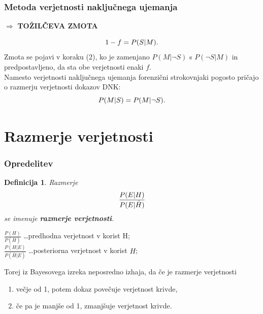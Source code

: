 \documentclass{beamer}
\newtheorem{definicija}{Definicija}
\begin{document}
\begin{frame}
    \frametitle{Metoda verjetnosti naključnega ujemanja}
    \begin{block}{}
        \centering
        $\Rightarrow$ \textbf{TOŽILČEVA ZMOTA}
    \end{block} \vspace{2mm}
    \[
        1 - f = P(S \lvert M). \vspace{2mm}
    \]
     Zmota se pojavi v koraku (2), ko je zamenjano $P(M \lvert \neg S)$ s $P(\neg S \lvert M)$ in predpostavljeno, da sta obe verjetnosti enaki $f$. \\\vspace{2mm}
     Namesto verjetnosti naključnega ujemanja forenzični strokovnjaki pogosto pričajo o razmerju verjetnosti dokazov DNK:
     \[
        P(M \lvert S) = P(M \lvert \neg S). \vspace{2mm}
     \] 
\end{frame}

\section{Razmerje verjetnosti}

\begin{frame}
    \frametitle{Opredelitev}
    \begin{definicija}
        Razmerje
        \[
            \frac{P(E \lvert H)}{P(E \lvert \bar{H})} \vspace{2mm}
        \] 
         se imenuje \textbf{razmerje verjetnosti}.
     \end{definicija} \vspace{2mm}
    $\frac{P(H)}{P(\bar{H})}$ \dots predhodna verjetnost v korist H;\\ \vspace{2mm}
    $\frac{P(H \lvert E)}{P(\bar{H} \lvert E)}$ \dots posteriorna verjetnost v korist $H$;
     \begin{block}{}
        Torej iz Bayesovega izreka neposredno izhaja, da če je razmerje verjetnosti 
        \begin{enumerate}
            \item večje od 1, potem dokaz povečuje verjetnost krivde,
            \item če pa je manjše od 1, zmanjšuje verjetnost krivde.
        \end{enumerate}
     \end{block}
\end{frame}
\end{document}
